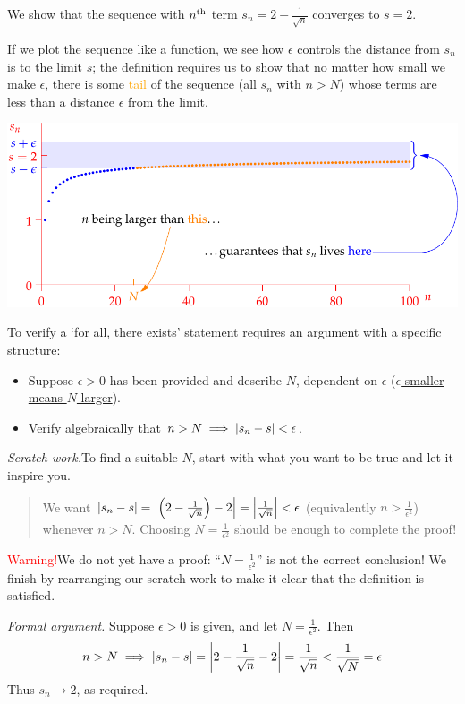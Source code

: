 
\goodbreak


\begin{example}{}{}
We show that the sequence with $n\textsuperscript{th}$ term $s_n=2-\frac 1{\sqrt n}$ converges to $s=2$.\smallbreak

If we plot the sequence like a function, we see how $\epsilon$ controls the distance from $s_n$ is to the limit $s$; the definition requires us to show that no matter how small we make $\epsilon$, there is some \textcolor{orange}{tail} of the sequence (all $s_n$ with $n>N$) whose terms are less than a distance $\epsilon$ from the limit.\vspace{-5pt}

\begin{center}
\includegraphics[scale=0.9]{limitdef-pic}\vspace{-8pt}
\end{center}

To verify a `for all, there exists' statement requires an argument with a specific structure:
\begin{itemize}\itemsep0pt
  \item Suppose $\epsilon>0$ has been provided and describe $N$, dependent on $\epsilon$ (\href{http://www.math.uci.edu/~ndonalds/math140a/limitdefanim.html}{$\epsilon$ smaller means $N$ larger}).
  \item Verify algebraically that $n>N\implies\left| s_n-s\right|<\epsilon$.
\end{itemize}

\emph{Scratch work.}\quad To find a suitable $N$, start with what you want to be true and let it inspire you.
\begin{quote}
We want $\left| s_n-s\right|=\left| \left(2-\frac 1{\sqrt n}\right)-2\right| =\left| \frac 1{\sqrt n}\right|<\epsilon$ (equivalently $n>\frac 1{\epsilon^2}$) whenever $n>N$. Choosing $N=\frac 1{\epsilon^2}$ should be enough to complete the proof!
\end{quote}
\textcolor{red}{Warning!}\quad We do not yet have a proof: ``$N=\frac 1{\epsilon^2}$'' is not the correct conclusion! We finish by rearranging our scratch work to make it clear that the definition is satisfied.\medbreak

\emph{Formal argument.}\quad
Suppose $\epsilon>0$ is given, and let $N=\frac 1{\epsilon^2}$. Then
\[
n>N\implies \left| s_n-s\right|=\left| 2-\frac 1{\sqrt n}-2\right| =\frac 1{\sqrt n}<\frac 1{\sqrt N}=\epsilon
\]
Thus $s_n\to 2$, as required.
\end{example}

